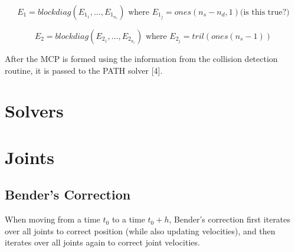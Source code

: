 \documentclass{article}
\begin{document}
\begin{equation}
E_1 = blockdiag(E_{1_1}, \dots , E_{1_{n_c}}) \text{ where } E_{1_j} = ones(n_s - n_d,1) \text{(is this true?)}
\nonumber
\end{equation}

\begin{equation}
E_2 = blockdiag(E_{2_1}, \dots , E_{2_{n_c}}) \text{ where } E_{2_j} = tril(ones(n_s - 1))
\nonumber
\end{equation}

After the MCP is formed using the information from the collision detection routine, it is passed to the PATH solver [4].  




\section{Solvers}

%
%


\newpage
\section{Joints}

\subsection{Bender's Correction}
When moving from a time $t_0$ to a time $t_0 + h$, Bender's correction first iterates over all joints to correct position (while also updating velocities), and then iterates over all joints again to correct joint velocities. 
\end{document}
